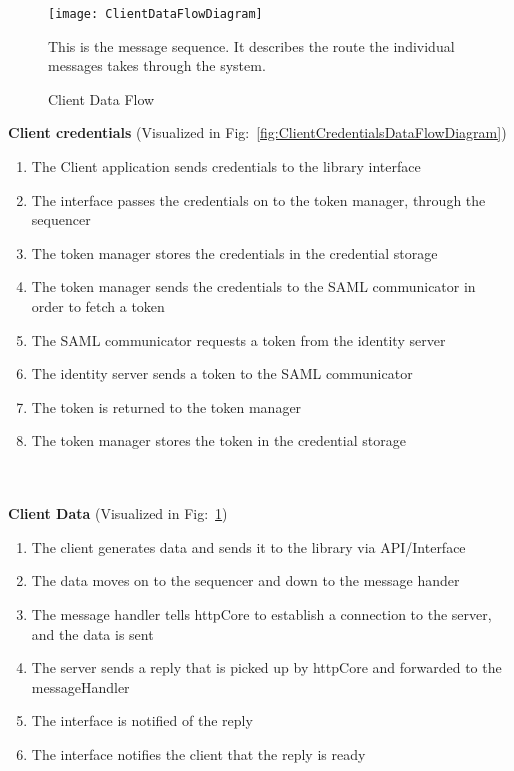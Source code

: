     \begin{figure}[h]
        \centering
        \texttt{[image: ClientDataFlowDiagram]}
        \caption{Client Data Flow}
        This is the message sequence. It describes the route the individual messages takes through the system. 
        \label{fig:ClientDataFlowDiagram}
    \end{figure}
    
	\textbf{Client credentials} (Visualized in Fig:~\ref{fig:ClientCredentialsDataFlowDiagram})
		\begin{enumerate}
			\item The Client application sends credentials to the library interface
			\item The interface passes the credentials on to the token manager, through the sequencer
			\item The token manager stores the credentials in the credential storage
			\item The token manager sends the credentials to the SAML communicator in order to fetch a token
			\item The SAML communicator requests a token from the identity server
			\item The identity server sends a token to the SAML communicator
			\item The token is returned to the token manager
			\item The token manager stores the token in the credential storage
		\end{enumerate}
		\\\\	
		\textbf{Client Data} (Visualized in Fig:~\ref{fig:ClientDataFlowDiagram})
		\begin{enumerate}
			\item The client generates data and sends it to the library via API/Interface
			\item The data moves on to the sequencer and down to the message hander
			\item The message handler tells httpCore to establish a connection to the server, and the data is sent
			\item The server sends a reply that is picked up by httpCore and forwarded to the messageHandler
			\item The interface is notified of the reply
			\item The interface notifies the client that the reply is ready
		\end{enumerate}
		
